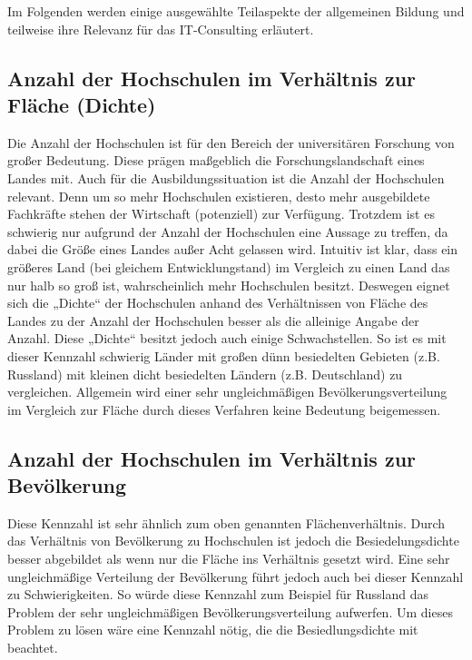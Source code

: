 Im Folgenden werden einige ausgewählte Teilaspekte der allgemeinen Bildung und teilweise ihre Relevanz für das IT-Consulting erläutert.

\subsection*{Anzahl der Hochschulen im Verhältnis zur Fläche (Dichte)}
Die Anzahl der Hochschulen ist für den Bereich der universitären Forschung von großer Bedeutung. Diese prägen maßgeblich die Forschungslandschaft eines Landes mit. Auch für die Ausbildungssituation ist die Anzahl der Hochschulen relevant. Denn um so mehr Hochschulen existieren, desto mehr ausgebildete Fachkräfte stehen der Wirtschaft (potenziell) zur Verfügung. 
Trotzdem ist es schwierig nur aufgrund der Anzahl der Hochschulen eine Aussage zu treffen, da dabei die Größe eines Landes außer Acht gelassen wird. Intuitiv ist klar, dass ein größeres Land (bei gleichem Entwicklungstand) im Vergleich zu einen Land das nur halb so groß ist, wahrscheinlich mehr Hochschulen besitzt. Deswegen eignet sich die „Dichte“ der Hochschulen anhand des Verhältnissen von  Fläche des Landes zu der Anzahl der Hochschulen besser als die alleinige Angabe der Anzahl.
Diese „Dichte“ besitzt jedoch auch einige Schwachstellen. So ist es mit dieser Kennzahl schwierig Länder mit großen dünn besiedelten Gebieten (z.B. Russland) mit kleinen dicht besiedelten Ländern (z.B. Deutschland) zu vergleichen. Allgemein wird einer sehr ungleichmäßigen Bevölkerungsverteilung im Vergleich zur Fläche durch dieses Verfahren keine Bedeutung beigemessen.

\subsection*{Anzahl der Hochschulen im Verhältnis zur Bevölkerung}
Diese Kennzahl ist sehr ähnlich zum oben genannten Flächenverhältnis. Durch das Verhältnis von Bevölkerung zu Hochschulen ist jedoch die Besiedelungsdichte besser abgebildet als wenn nur die Fläche ins Verhältnis gesetzt wird.
Eine sehr ungleichmäßige Verteilung der Bevölkerung führt jedoch auch bei dieser Kennzahl zu Schwierigkeiten. So würde diese Kennzahl zum Beispiel für Russland das Problem der sehr ungleichmäßigen Bevölkerungsverteilung aufwerfen. Um dieses Problem zu lösen wäre eine Kennzahl nötig, die die Besiedlungsdichte mit beachtet.

